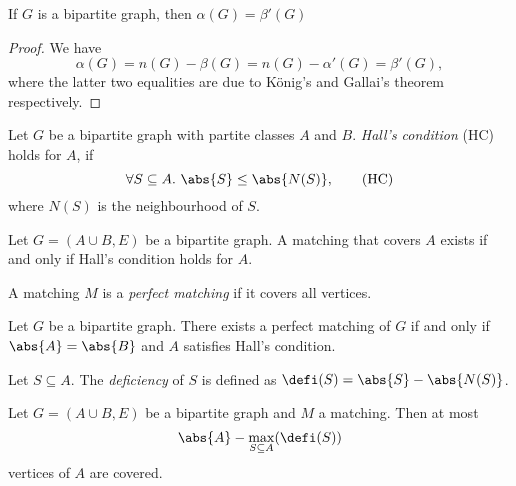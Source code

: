 \begin{corollary}
    If $G$ is a bipartite graph, then $\alpha(G) = \beta'(G)$
\end{corollary}

\begin{proof}
    We have
    \[
        \alpha(G) = n(G) - \beta(G) = n(G) - \alpha'(G) = \beta'(G),
    \]
    where the latter two equalities are due to König's and Gallai's 
    theorem respectively.
\end{proof}

\begin{definition}
    Let $G$ be a bipartite graph with partite classes $A$ and $B$. 
    \emph{Hall's condition} (HC) holds for $A$,
    if 
    \begin{equation}
        \forall S \subseteq A.~\abs{S} \le \abs{N(S)},
        \tag{HC}
        \label{eq:HC}
    \end{equation}
    where $N(S)$ is the neighbourhood of $S$.
\end{definition}

\begin{theorem}[Hall]
    Let $G = (A \cup B, E)$ be a bipartite graph. A matching that covers $A$ 
    exists if and only if Hall's condition holds for $A$.
\end{theorem}


\begin{definition}
    A matching $M$ is a \emph{perfect matching} if 
    it covers all vertices.
\end{definition}

\begin{corollary}
    Let $G$ be a bipartite graph. There exists a perfect matching of $G$ 
    if and only if $\abs{A} = \abs{B}$ and $A$ satisfies Hall's condition.
\end{corollary}

\begin{definition}
    Let $S \subseteq A$. The \emph{deficiency} of $S$ is 
    defined as $\defi(S) = \abs{S} - \abs{N(S)}$.
\end{definition}

\begin{theorem}
    Let $G = (A \cup B, E)$ be a bipartite graph and $M$ a matching. Then at 
    most
    \[
        \abs{A} - \max_{S \subseteq A}(\defi(S))
    \]
    vertices of $A$ are covered.
\end{theorem}

